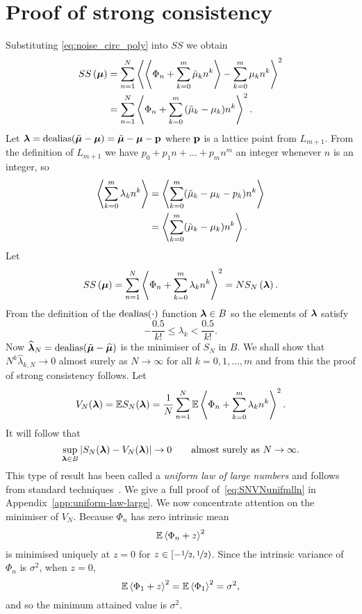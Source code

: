 \documentclass[journal]{IEEEtran}
\begin{document}
\section{Proof of strong consistency}\label{sec:strongconstproof}
 Substituting \eqref{eq:noise_circ_poly} into $SS$ we obtain
 \begin{align*}
SS\left( \boldsymbol{\mu} \right) &= \sum_{n=1}^{N}\left\langle  \left\langle  \Phi_n + \sum_{k = 0}^{m}{\tilde{\mu}_k n^k}  \right\rangle - \sum_{k = 0}^{m}{\mu_k n^k}  \right\rangle^{2} \\
&= \sum_{n=1}^{N}\left\langle   \Phi_n + \sum_{k = 0}^{m}{(\tilde{\mu}_k - \mu_k) n^k}  \right\rangle^{2}.
\end{align*}
Let $\boldsymbol{\lambda} = \operatorname{dealias}(\tilde{\boldsymbol{\mu}} - \boldsymbol{\mu}) = \tilde{\boldsymbol{\mu}} - \boldsymbol{\mu} - \mathbf{p}$ where $\mathbf{p}$ is a lattice point from $L_{m+1}$. From the definition of $L_{m+1}$ we have $p_0 + p_1 n + \dots + p_{m} n^m$ an integer whenever $n$ is an integer, so
\begin{align*}
\left\langle \sum_{k=0}^{m}\lambda_k n^k  \right\rangle &= \left\langle \sum_{k=0}^{m}(\tilde{\mu}_k - \mu_k - p_k) n^k  \right\rangle \\
&= \left\langle \sum_{k=0}^{m}(\tilde{\mu}_k - \mu_k) n^k  \right\rangle.
\end{align*}
Let
\[
SS\left( \boldsymbol{\mu} \right) = \sum_{n=1}^{N}\left\langle   \Phi_n + \sum_{k = 0}^{m}{\lambda_k n^k}  \right\rangle  ^{2} = N S_{N}\left( \boldsymbol{\lambda} \right).
 \]
From the definition of the $\operatorname{dealias}(\cdot)$ function $\boldsymbol{\lambda} \in B$ so the elements of $\boldsymbol{\lambda}$ satisfy
 \begin{equation} \label{eq:identifiability}
 -\frac{0.5}{k!} \leq \lambda_k < \frac{0.5}{k!}.
 \end{equation} 
Now $\widehat{\boldsymbol{\lambda}}_N = \operatorname{dealias}(\tilde{\boldsymbol{\mu}} - \widehat{\boldsymbol{\mu}})$ is the minimiser of $S_{N}$ in $B$. We shall show that $N^k\widehat{\lambda}_{k,N}\rightarrow0$ almost surely as $N\rightarrow\infty$ for all $k = 0,1, \dots, m$ and from this the proof of strong consistency follows.  Let
\[
V_N(\boldsymbol{\lambda}) =  {\mathbb E} S_N(\boldsymbol{\lambda}) = \frac{1}{N}\sum_{n=1}^{N} {\mathbb E} \left\langle   \Phi_{n}+\sum_{k = 0}^{m}{\lambda_k n^k} \right\rangle  ^{2}.
\]
It will follow that
 \begin{equation}\label{eq:SNVNunifmlln}
\sup_{\lambdabf \in B}\sabs{S_N(\lambdabf) - V_N(\lambdabf)} \rightarrow 0 \qquad \text{almost surely as $N\rightarrow\infty$}.  
 \end{equation}
This type of result has been called a \emph{uniform law of large numbers} and follows from standard techniques~\cite{Pollard_conv_stat_proc_1984}.  We give a full proof of~\eqref{eq:SNVNunifmlln} in Appendix~\ref{app:uniform-law-large}.  We now concentrate attention on the minimiser of $V_N$. Because $\Phi_n$ has zero intrinsic mean 
\begin{equation}\label{eq:Efracpartmined}
\expect \fracpart{ \Phi_n + z }^{2}
\end{equation}
is minimised uniquely at $z = 0$ for $z \in [-\nicefrac{1}{2}, \nicefrac{1}{2})$.  Since the intrinsic variance of $\Phi_n$ is $\sigma^2$, when $z = 0$,
\begin{equation}\label{eq:Efracpartphi}
\expect\fracpart{\Phi_1+z}^{2} = \expect\fracpart{\Phi_1}^{2} = \sigma^2,
\end{equation}
and so the minimum attained value is $\sigma^2$.
\end{document}
